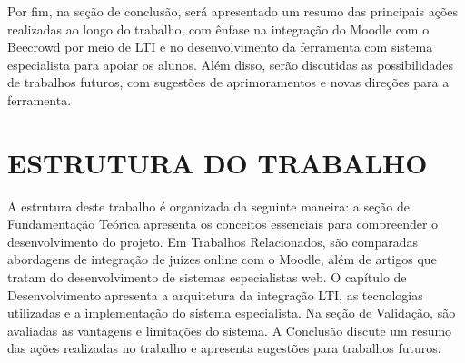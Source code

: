 Por fim, na seção de conclusão, será apresentado um resumo das principais ações realizadas ao longo do trabalho, com ênfase na integração do Moodle com o Beecrowd por meio de LTI e no desenvolvimento da ferramenta com sistema especialista para apoiar os alunos. Além disso, serão discutidas as possibilidades de trabalhos futuros, com sugestões de aprimoramentos e novas direções para a ferramenta.

\section{ESTRUTURA DO TRABALHO}

A estrutura deste trabalho é organizada da seguinte maneira: a seção de Fundamentação Teórica apresenta os conceitos essenciais para compreender o desenvolvimento do projeto. Em Trabalhos Relacionados, são comparadas abordagens de integração de juízes online com o Moodle, além de artigos que tratam do desenvolvimento de sistemas especialistas web. O capítulo de Desenvolvimento apresenta a arquitetura da integração LTI, as tecnologias utilizadas e a implementação do sistema especialista. Na seção de Validação, são avaliadas as vantagens e limitações do sistema. A Conclusão discute um resumo das ações realizadas no trabalho e apresenta sugestões para trabalhos futuros.
